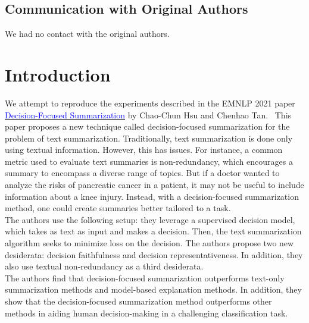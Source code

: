 \documentclass{article}
\newcommand{\blue}[1]{\textcolor{blue}{#1}}
\begin{document}
\subsection*{Communication with Original Authors}
We had no contact with the original authors.
\newpage


\section{Introduction}
We attempt to reproduce the experiments described in the EMNLP 2021 paper \href{https://aclanthology.org/2021.emnlp-main.10.pdf}{\blue{Decision-Focused Summarization}} by Chao-Chun Hsu
and Chenhao Tan.~\cite{hsu-tan-2021-decision} This paper proposes a new technique called decision-focused summarization for the problem of text summarization. Traditionally, text summarization is done
only using textual information. However, this has issues. For instance, a common metric used to evaluate text summaries is non-redundancy, which encourages a summary to encompass a diverse range of
topics. But if a doctor wanted to analyze the risks of pancreatic cancer in a patient, it may not be useful to include information about a knee injury. Instead, with a decision-focused summarization
method, one could create summaries better tailored to a task. \\

The authors use the following setup: they leverage a supervised decision model, which takes as text as input and makes a decision. Then, the text summarization algorithm seeks to minimize loss on the
decision. The authors propose two new desiderata: decision faithfulness and decision representativeness. In addition, they also use textual non-redundancy as a third desiderata. \\

The authors find that decision-focused summarization outperforms text-only summarization methods and model-based explanation methods. In addition, they show that the decision-focused summarization
method outperforms other methods in aiding human decision-making in a challenging classification task.
\end{document}
